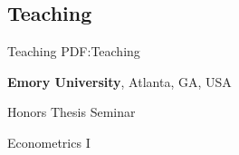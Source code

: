 \documentclass[letterpaper,10pt,oneside]{article}
\begin{document}
\begin{body}
%
%
%
%
%
%








\section
{Teaching}
{Teaching}
{PDF:Teaching}

\textbf{Emory University},
Atlanta, GA, USA


\par
Honors Thesis Seminar
\hfill

\par
Econometrics I
\hfill


\end{body}
\end{document}
